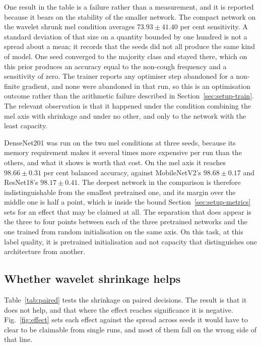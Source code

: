 \documentclass{ieeeaccess}
\newcommand{\figref}[1]{Fig.~\ref{#1}}
\begin{document}
One result in the table is a failure rather than a measurement, and it is reported because
it bears on the stability of the smaller network. The compact network on the wavelet
shrunk mel condition averages $73.93 \pm 41.40$ per cent sensitivity. A standard deviation
of that size on a quantity bounded by one hundred is not a spread about a mean; it records
that the seeds did not all produce the same kind of model. One seed converged to the
majority class and stayed there, which on this prior produces an accuracy equal to the
non-cough frequency and a sensitivity of zero. The trainer reports any optimiser step
abandoned for a non-finite gradient, and none were abandoned in that run, so this is an
optimisation outcome rather than the arithmetic failure described in
Section~\ref{sec:setup-train}. The relevant observation is that it happened under the
condition combining the mel axis with shrinkage and under no other, and only to the
network with the least capacity.

DenseNet201 was run on the two mel conditions at three seeds, because its memory
requirement makes it several times more expensive per run than the others, and what it
shows is worth that cost. On the mel axis it reaches $98.66 \pm 0.31$ per cent balanced
accuracy, against MobileNetV2's $98.68 \pm 0.17$ and ResNet18's $98.17 \pm 0.41$. The
deepest network in the comparison is therefore indistinguishable from the smallest
pretrained one, and its margin over the middle one is half a point, which is inside the
bound Section~\ref{sec:setup-metrics} sets for an effect that may be claimed at all. The
separation that does appear is the three to four points between each of the three
pretrained networks and the one trained from random initialisation on the same axis. On
this task, at this label quality, it is pretrained initialisation and not capacity that
distinguishes one architecture from another.

\subsection{Whether wavelet shrinkage helps}\label{sec:res-denoise}

Table~\ref{tab:paired} tests the shrinkage on paired decisions. The result is that it does
not help, and that where the effect reaches significance it is negative. \figref{fig:effect} sets each effect against the spread across seeds it would have to clear to be claimable from single runs, and most of them fall on the wrong side of that line.
\end{document}
